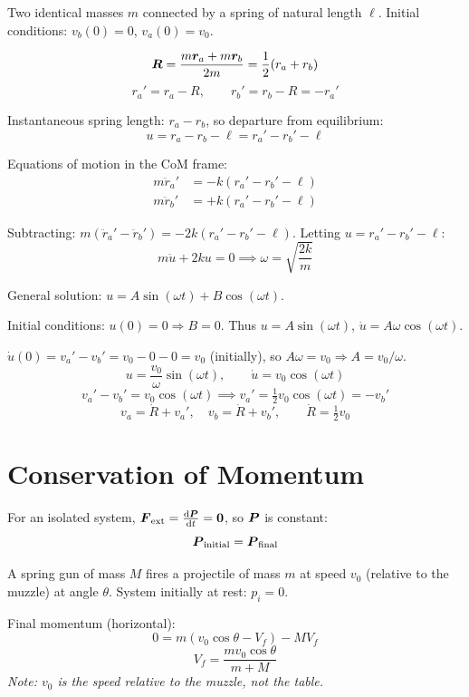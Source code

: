 \begin{example}
Two identical masses $m$ connected by a spring of natural length $\ell$. Initial conditions: $v_b(0) = 0$, $v_a(0) = v_0$.

\[
    \vect{R} = \frac{m\lvect{r}_a + m\lvect{r}_b}{2m} = \frac{1}{2}(r_a + r_b)
\]
\[
    r_a' = r_a - R, \qquad \boxed{r_b' = r_b - R = -r_a'}
\]

Instantaneous spring length: $r_a - r_b$, so departure from equilibrium:
\[
    u = r_a - r_b - \ell = r_a' - r_b' - \ell
\]

Equations of motion in the CoM frame:
\begin{align*}
    m\ddot{r}_a' &= -k(r_a' - r_b' - \ell) \\
    m\ddot{r}_b' &= +k(r_a' - r_b' - \ell)
\end{align*}

Subtracting: $m(\ddot{r}_a' - \ddot{r}_b') = -2k(r_a' - r_b' - \ell)$. Letting $u = r_a' - r_b' - \ell$:
\[
    m\ddot{u} + 2ku = 0 \implies \omega = \sqrt{\frac{2k}{m}}
\]

General solution: $u = A\sin(\omega t) + B\cos(\omega t)$.

Initial conditions: $u(0) = 0 \Rightarrow B = 0$. Thus $u = A\sin(\omega t)$, $\dot{u} = A\omega\cos(\omega t)$.

$\dot{u}(0) = v_a' - v_b' = v_0 - 0 - 0 = v_0$ (initially), so $A\omega = v_0 \Rightarrow A = v_0/\omega$.
\[
    u = \frac{v_0}{\omega}\sin(\omega t), \qquad \dot{u} = v_0\cos(\omega t)
\]
\[
    v_a' - v_b' = v_0\cos(\omega t) \implies v_a' = \tfrac{1}{2}v_0\cos(\omega t) = -v_b'
\]
\[
    v_a = \dot{R} + v_a', \quad v_b = \dot{R} + v_b', \qquad \boxed{\dot{R} = \tfrac{1}{2}v_0}
\]
\end{example}

\section{Conservation of Momentum}

\begin{theorem}
For an isolated system, $\vect{F}_{\text{ext}} = \dv{\vect{P}}{t} = \vect{0}$, so $\vect{P}$ is constant:
\[
    \vect{P}_{\text{initial}} = \vect{P}_{\text{final}}
\]
\end{theorem}

\begin{example}
A spring gun of mass $M$ fires a projectile of mass $m$ at speed $v_0$ (relative to the muzzle) at angle $\theta$. System initially at rest: $p_i = 0$.

Final momentum (horizontal):
\[
    0 = m(v_0\cos\theta - V_f) - MV_f
\]
\[
    V_f = \frac{mv_0\cos\theta}{m+M}
\]
\textit{Note: $v_0$ is the speed relative to the muzzle, not the table.}
\end{example}

